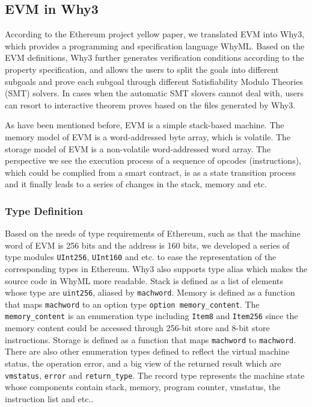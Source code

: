 \documentclass[runningheads]{llncs}
\begin{document}
\subsection{EVM in Why3}
According to the Ethereum project yellow paper\cite{wood2014ethereum}, we translated EVM into Why3, which provides a programming and specification language WhyML. Based on the EVM definitions, Why3 further generates verification conditions according to the property specification, and allows the users to split the goals into different subgoals and prove each subgoal through different Satisfiability Modulo Theories (SMT) solvers. In cases when the automatic SMT slovers cannot deal with, users can resort to interactive theorem proves based on the files generated by Why3.

As have been mentioned before, EVM is a simple stack-based machine. The memory model of EVM is a word-addressed byte array, which is volatile. The storage model of EVM is a non-volatile word-addressed word array. The perspective we see the execution process of a sequence of opcodes (instructions), which could be complied from a smart contract, is as a state transition process and it finally leads to a series of changes in the stack, memory and etc.  

\subsubsection{Type Definition}
Based on the needs of type requirements of Ethereum, such as that the machine word of EVM is 256 bits and the address is 160 bits, we developed a series of type modules \texttt{UInt256}, \texttt{UInt160} and etc. to ease the representation of the corresponding types in Ethereum. Why3 also supports type alias which makes the source code in WhyML more readable. 
Stack is defined as a list of elements whose type are \texttt{uint256}, aliased by \texttt{machword}. Memory is defined as a function that maps \texttt{machword} to an option type \texttt{option memory\_content}. The \texttt{memory\_content} is an enumeration type including \texttt{Item8} and \texttt{Item256} since the memory content could be accessed through 256-bit store and 8-bit store instructions. Storage is defined as a function that maps \texttt{machword} to \texttt{machword}. There are also other enumeration types defined to reflect the virtual machine status, the operation error, and a big view of the returned result which are \texttt{vmstatus}, \texttt{error} and \texttt{return\_type}. The record type  represents the machine state whose components contain stack, memory, program counter, vmstatus, the instruction list and etc..
\end{document}
